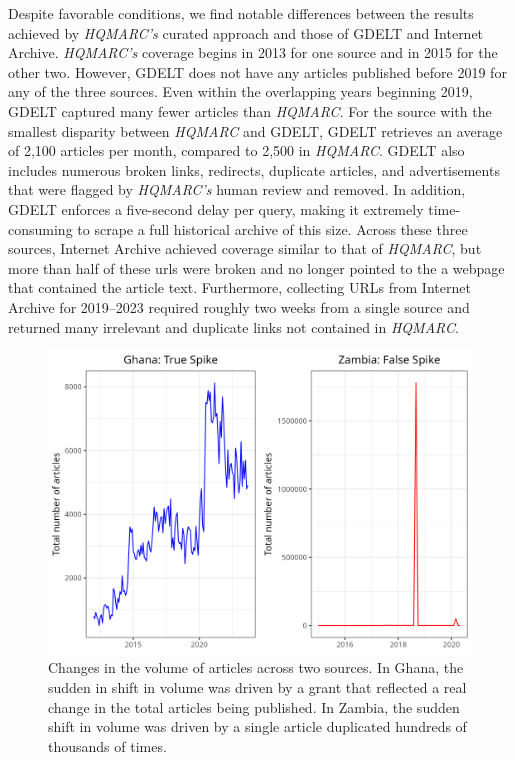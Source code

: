 \documentclass[
  letterpaper,
  DIV=11,
  numbers=noendperiod]{scrartcl}
\begin{document}
Despite favorable conditions, we find notable differences between the
results achieved by \emph{HQMARC's} curated approach and those of GDELT
and Internet Archive. \emph{HQMARC's} coverage begins in 2013 for one
source and in 2015 for the other two. However, GDELT does not have any
articles published before 2019 for any of the three sources. Even within
the overlapping years beginning 2019, GDELT captured many fewer articles
than \emph{HQMARC}. For the source with the smallest disparity between
\emph{HQMARC} and GDELT, GDELT retrieves an average of 2,100 articles
per month, compared to 2,500 in \emph{HQMARC}. GDELT also includes
numerous broken links, redirects, duplicate articles, and advertisements
that were flagged by \emph{HQMARC's} human review and removed. In
addition, GDELT enforces a five-second delay per query, making it
extremely time-consuming to scrape a full historical archive of this
size. Across these three sources, Internet Archive achieved coverage
similar to that of \emph{HQMARC}, but more than half of these urls were
broken and no longer pointed to the a webpage that contained the article
text. Furthermore, collecting URLs from Internet Archive for 2019--2023
required roughly two weeks from a single source and returned many
irrelevant and duplicate links not contained in \emph{HQMARC}.

\begin{figure}

{\centering \includegraphics{source_comparison/figures/true_false_spike.png}

}

\caption{\label{fig-true_false_spike}Changes in the volume of articles
across two sources. In Ghana, the sudden in shift in volume was driven
by a grant that reflected a real change in the total articles being
published. In Zambia, the sudden shift in volume was driven by a single
article duplicated hundreds of thousands of times.}

\end{figure}
\end{document}
